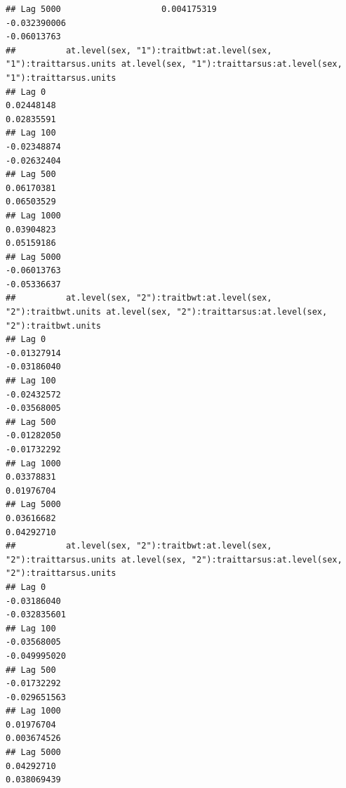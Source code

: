 \documentclass[
  12pt,
]{book}
\begin{document}
\begin{verbatim}
## Lag 5000                    0.004175319                                                  -0.032390006                                                      -0.06013763
##          at.level(sex, "1"):traitbwt:at.level(sex, "1"):traittarsus.units at.level(sex, "1"):traittarsus:at.level(sex, "1"):traittarsus.units
## Lag 0                                                          0.02448148                                                          0.02835591
## Lag 100                                                       -0.02348874                                                         -0.02632404
## Lag 500                                                        0.06170381                                                          0.06503529
## Lag 1000                                                       0.03904823                                                          0.05159186
## Lag 5000                                                      -0.06013763                                                         -0.05336637
##          at.level(sex, "2"):traitbwt:at.level(sex, "2"):traitbwt.units at.level(sex, "2"):traittarsus:at.level(sex, "2"):traitbwt.units
## Lag 0                                                      -0.01327914                                                      -0.03186040
## Lag 100                                                    -0.02432572                                                      -0.03568005
## Lag 500                                                    -0.01282050                                                      -0.01732292
## Lag 1000                                                    0.03378831                                                       0.01976704
## Lag 5000                                                    0.03616682                                                       0.04292710
##          at.level(sex, "2"):traitbwt:at.level(sex, "2"):traittarsus.units at.level(sex, "2"):traittarsus:at.level(sex, "2"):traittarsus.units
## Lag 0                                                         -0.03186040                                                        -0.032835601
## Lag 100                                                       -0.03568005                                                        -0.049995020
## Lag 500                                                       -0.01732292                                                        -0.029651563
## Lag 1000                                                       0.01976704                                                         0.003674526
## Lag 5000                                                       0.04292710                                                         0.038069439

\end{verbatim}
\end{document}
